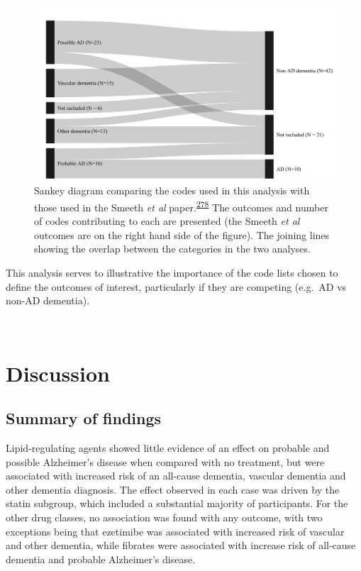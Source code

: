 \documentclass[a4paper, twoside]{templates/ociamthesis}
\begin{document}
~





\begin{figure}[H]
\includegraphics[width=1\linewidth]{figures/cprd-analysis/sankey_diagram} \caption[Comparison of code used in this analysis with those used in the Smeeth et al.~2010 paper]{Sankey diagram comparing the codes used in this analysis with those used in the Smeeth \emph{et al} paper.\textsuperscript{\protect\hyperlink{ref-smeeth2009}{278}} The outcomes and number of codes contributing to each are presented (the Smeeth \emph{et al} outcomes are on the right hand side of the figure). The joining lines showing the overlap between the categories in the two analyses.}\label{fig:smeethComparison}
\end{figure}

This analysis serves to illustrative the importance of the code lists chosen to define the outcomes of interest, particularly if they are competing (e.g.~AD vs non-AD dementia).

~

\hypertarget{discussion-2}{%
\section{Discussion}\label{discussion-2}}

\hypertarget{summary-of-findings-1}{%
\subsection{Summary of findings}\label{summary-of-findings-1}}

Lipid-regulating agents showed little evidence of an effect on probable and possible Alzheimer's disease when compared with no treatment, but were associated with increased risk of an all-cause dementia, vascular dementia and other dementia diagnosis. The effect observed in each case was driven by the statin subgroup, which included a substantial majority of participants. For the other drug classes, no association was found with any outcome, with two exceptions being that ezetimibe was associated with increased risk of vascular and other dementia, while fibrates were associated with increase risk of all-cause dementia and probable Alzheimer's disease.
\end{document}
